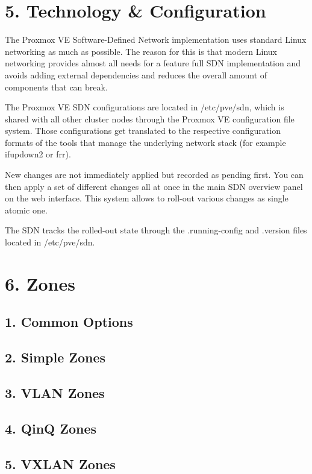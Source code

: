 \section{5. Technology & Configuration}

The Proxmox VE Software-Defined Network implementation uses standard Linux networking as much as possible. The reason for this is that modern Linux networking provides almost all needs for a feature full SDN implementation and avoids adding external dependencies and reduces the overall amount of components that can break.

The Proxmox VE SDN configurations are located in /etc/pve/sdn, which is shared with all other cluster nodes through the Proxmox VE configuration file system. Those configurations get translated to the respective configuration formats of the tools that manage the underlying network stack (for example ifupdown2 or frr).

New changes are not immediately applied but recorded as pending first. You can then apply a set of different changes all at once in the main SDN overview panel on the web interface. This system allows to roll-out various changes as single atomic one.

The SDN tracks the rolled-out state through the .running-config and .version files located in /etc/pve/sdn.


\section{6. Zones}

\subsection{1. Common Options}

\subsection{2. Simple Zones}

\subsection{3. VLAN Zones}

\subsection{4. QinQ Zones}

\subsection{5. VXLAN Zones}

